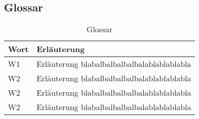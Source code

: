 \subsection{Glossar}
\begin{table}[h]
  \centering
  \begin{tabular}{ l | l }

    \hline
    \textbf{Wort} & \textbf{Erläuterung} \\
    \hline
    W1 & Erläuterung blabalbalbalbalbalablablablabla \\
    \hline
    W2 & Erläuterung blabalbalbalbalbalablablablabla \\
    \hline
    W2 & Erläuterung blabalbalbalbalbalablablablabla \\
    \hline
    W2 & Erläuterung blabalbalbalbalbalablablablabla \\
    \hline
  \end{tabular}
  \caption[Glossar]{Glossar}
\end{table}